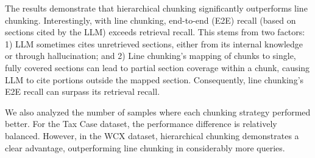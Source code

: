 

The results demonstrate that hierarchical chunking significantly outperforms line chunking. Interestingly, with line chunking, end-to-end (E2E) recall (based on sections cited by the LLM) exceeds retrieval recall. This stems from two factors: 1) LLM sometimes cites unretrieved sections, either from its internal knowledge or through hallucination; and 2) Line chunking's mapping of chunks to single, fully covered sections can lead to partial section coverage within a chunk, causing LLM to cite portions outside the mapped section. Consequently, line chunking's E2E recall can surpass its retrieval recall.

We also analyzed the number of samples where each chunking strategy performed better. For the Tax Case dataset, the performance difference is relatively balanced. However, in the WCX dataset, hierarchical chunking demonstrates a clear advantage, outperforming line chunking in considerably more queries.


